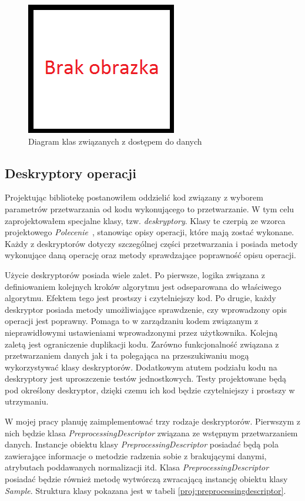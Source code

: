 \documentclass[../thesis.tex]{subfiles}
\begin{document}
\begin{figure}[h]
\centering
\includegraphics{missing.png}
\caption{Diagram klas związanych z dostępem do danych}
\label{proj:input_diagram}
\end{figure}

\subsection{Deskryptory operacji}

Projektując bibliotekę postanowiłem oddzielić kod związany z wyborem parametrów przetwarzania od kodu wykonującego to przetwarzanie. W tym celu zaprojektowałem specjalne klasy, tzw. \emph{deskryptory}. Klasy te czerpią ze wzorca projektowego \emph{Polecenie}~\cite{gang_of_four}, stanowiąc opisy operacji, które mają zostać wykonane. Każdy z deskryptorów dotyczy szczególnej części przetwarzania i posiada metody wykonujące daną operację oraz metody sprawdzające poprawność opisu operacji.

Użycie deskryptorów posiada wiele zalet. Po pierwsze, logika związana z definiowaniem kolejnych kroków algorytmu jest odseparowana do właściwego algorytmu. Efektem tego jest prostszy i czytelniejszy kod. Po drugie, każdy deskryptor posiada metody umożliwiające sprawdzenie, czy wprowadzony opis operacji jest poprawny. Pomaga to w zarządzaniu kodem związanym z nieprawidłowymi ustawieniami wprowadzonymi przez użytkownika. Kolejną zaletą jest ograniczenie duplikacji kodu. Zarówno funkcjonalność związana z przetwarzaniem danych jak i ta polegająca na przeszukiwaniu mogą wykorzystywać klasy deskryptorów. Dodatkowym atutem podziału kodu na deskryptory jest uproszczenie testów jednostkowych. Testy projektowane będą pod określony deskryptor, dzięki czemu ich kod będzie czytelniejszy i prostszy w utrzymaniu.

W mojej pracy planuję zaimplementować trzy rodzaje deskryptorów. Pierwszym z nich będzie klasa \emph{PreprocessingDescriptor} związana ze wstępnym przetwarzaniem danych. Instancje obiektu klasy \emph{PreprocessingDescriptor} posiadać będą pola zawierające informacje o metodzie radzenia sobie z brakującymi danymi, atrybutach poddawanych normalizacji itd. Klasa \emph{PreprocessingDescriptor} posiadać będzie również metodę wytwórczą zwracającą instancję obiektu klasy \emph{Sample}. Struktura klasy pokazana jest w tabeli \ref{proj:preprocessingdescriptor}.
\end{document}
